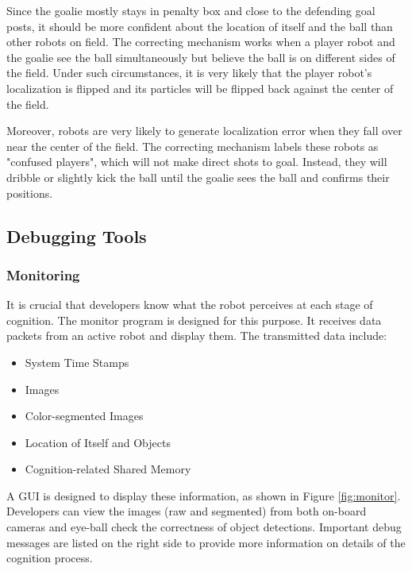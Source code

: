 \documentclass{article}
\begin{document}
	Since the goalie mostly stays in penalty box and close to the defending goal posts, it should be more confident about the location of itself and the ball than other robots on field. The correcting mechanism works when a player robot and the goalie see the ball simultaneously but believe the ball is on different sides of the field. Under such circumstances, it is very likely that the player robot's localization is flipped and its particles will be flipped back against the center of the field.

	Moreover, robots are very likely to generate localization error when they fall over near the center of the field. The correcting mechanism labels these robots as "confused players", which will not make direct shots to goal. Instead, they will dribble or slightly kick the ball until the goalie sees the ball and confirms their positions.

\subsection{Debugging Tools}
\subsubsection{Monitoring}    
	It is crucial that developers know what the robot perceives at each stage of cognition. The monitor program is designed for this purpose. It receives data packets from an active robot and display them. The transmitted data include:
	
	\begin{itemize}
		\item{System Time Stamps}
		\item{Images}
		\item{Color-segmented Images}
		\item{Location of Itself and Objects}
		\item{Cognition-related Shared Memory}
	\end{itemize}

	A GUI is designed to display these information, as shown in Figure \ref{fig:monitor}. Developers can view the images (raw and segmented) from both on-board cameras and eye-ball check the correctness of object detections. Important debug messages are listed on the right side to provide more information on details of the cognition process.
\end{document}
